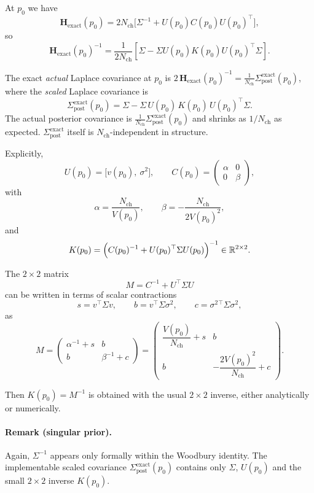 \documentclass[11pt]{article}
\begin{document}
At $p_0$ we have
\[
  \mathbf{H}_{\text{exact}}(p_0)
  =
  2N_{\text{ch}}
  \bigl[\Sigma^{-1} + U(p_0)C(p_0)U(p_0)^\top\bigr],
\]
so
\[
  \mathbf{H}_{\text{exact}}(p_0)^{-1}
  =
  \frac{1}{2N_{\text{ch}}}
  \left[
    \Sigma
    - \Sigma U(p_0)K(p_0)U(p_0)^\top \Sigma
  \right].
\]

The exact \emph{actual} Laplace covariance at $p_0$ is
$2\,\mathbf{H}_{\text{exact}}(p_0)^{-1} = \tfrac{1}{N_{\text{ch}}}
\Sigma_{\text{post}}^{\text{exact}}(p_0)$, where the
\emph{scaled} Laplace covariance is
\[
  \boxed{
    \Sigma_{\text{post}}^{\text{exact}}(p_0)
    =
    \Sigma
    - \Sigma\,U(p_0)\,K(p_0)\,U(p_0)^\top\Sigma.
  }
\]
The actual posterior covariance is $\tfrac{1}{N_{\text{ch}}}
\Sigma_{\text{post}}^{\text{exact}}(p_0)$ and shrinks as $1/N_{\text{ch}}$
as expected.  $\Sigma_{\text{post}}^{\text{exact}}$ itself is
$N_{\text{ch}}$-independent in structure.

Explicitly,
\[
  U(p_0) = \bigl[v(p_0),\ \sigma^2\bigr],
  \qquad
  C(p_0) =
  \begin{pmatrix}
    \alpha & 0\\[3pt]
    0      & \beta
  \end{pmatrix},
\]
with
\[
  \alpha = \frac{N_{\text{ch}}}{V(p_0)},
  \qquad
  \beta  = -\frac{N_{\text{ch}}}{2V(p_0)^2},
\]
and
\[
  K(p_0)
  =
  \Bigl(C(p_0)^{-1} + U(p_0)^\top\Sigma U(p_0)\Bigr)^{-1}
  \in \mathbb{R}^{2\times 2}.
\]

The $2\times 2$ matrix
\[
  M = C^{-1} + U^\top\Sigma U
\]
can be written in terms of scalar contractions
\[
  s = v^\top\Sigma v,
  \qquad
  b = v^\top\Sigma\sigma^2,
  \qquad
  c = \sigma^2{}^\top\Sigma\sigma^2,
\]
as
\[
  M =
  \begin{pmatrix}
    \alpha^{-1} + s & b\\[3pt]
    b & \beta^{-1} + c
  \end{pmatrix}
  =
  \begin{pmatrix}
    \dfrac{V(p_0)}{N_{\text{ch}}} + s & b\\[10pt]
    b & -\dfrac{2V(p_0)^2}{N_{\text{ch}}} + c
  \end{pmatrix}.
\]

Then $K(p_0) = M^{-1}$ is obtained with the usual $2\times 2$
inverse, either analytically or numerically.

\paragraph{Remark (singular prior).}
Again, $\Sigma^{-1}$ appears only formally within the Woodbury
identity.  The implementable scaled covariance
$\Sigma_{\text{post}}^{\text{exact}}(p_0)$ contains only $\Sigma$,
$U(p_0)$ and the small $2\times 2$ inverse $K(p_0)$.
\end{document}
